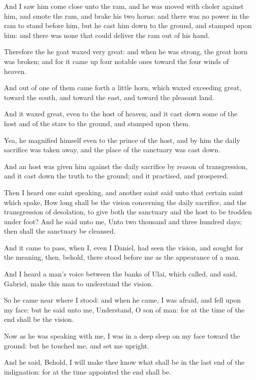 \Verse And I saw him come close unto the ram, and he was moved with choler against him, and smote the ram, and brake his two horns: and there was no power in the ram to stand before him, but he cast him down to the ground, and stamped upon him: and there was none that could deliver the ram out of his hand.

\Verse Therefore the he goat waxed very great: and when he was strong, the great horn was broken; and for it came up four notable ones toward the four winds of heaven.

\Verse And out of one of them came forth a little horn, which waxed exceeding great, toward the south, and toward the east, and toward the pleasant land.

\Verse And it waxed great, even to the host of heaven; and it cast down some of the host and of the stars to the ground, and stamped upon them.

\Verse Yea, he magnified himself even to the prince of the host, and by him the daily sacrifice was taken away, and the place of the sanctuary was cast down.

\Verse And an host was given him against the daily sacrifice by reason of transgression, and it cast down the truth to the ground; and it practised, and prospered.

\Verse Then I heard one saint speaking, and another saint said unto that certain saint which spake, How long shall be the vision concerning the daily sacrifice, and the transgression of desolation, to give both the sanctuary and the host to be trodden under foot?  \Verse And he said unto me, Unto two thousand and three hundred days; then shall the sanctuary be cleansed.

\Verse And it came to pass, when I, even I Daniel, had seen the vision, and sought for the meaning, then, behold, there stood before me as the appearance of a man.

\Verse And I heard a man's voice between the banks of Ulai, which called, and said, Gabriel, make this man to understand the vision.

\Verse So he came near where I stood: and when he came, I was afraid, and fell upon my face: but he said unto me, Understand, O son of man: for at the time of the end shall be the vision.

\Verse Now as he was speaking with me, I was in a deep sleep on my face toward the ground: but he touched me, and set me upright.

\Verse And he said, Behold, I will make thee know what shall be in the last end of the indignation: for at the time appointed the end shall be.


